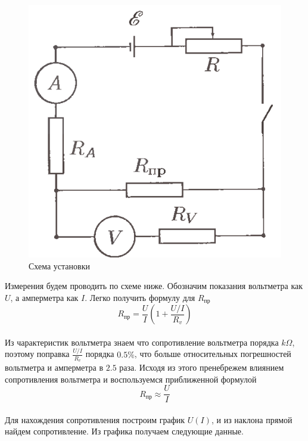 \documentclass[a4paper, 12pt]{article}
\begin{document}
    \begin{figure}
        \begin{center}
            \includegraphics[scale=0.3]{sxema.png}
            \caption{Схема установки}
        \end{center}
    \end{figure}
    Измерения будем проводить по схеме ниже. Обозначим показания вольтметра как $U$, а амперметра как $I$. Легко получить формулу для $R_{пр}$
    \[R_{пр} = \frac{U}{I}\left(1 + \frac{U/I}{R_{v}}\right)\]
    \paragraph{}
    Из чарактеристик вольтметра знаем что сопротивление вольтметра порядка $k\Omega$, поэтому поправка $\frac{U/I}{R_v}$ порядка $0.5\%$, что больше относительных погрешностей вольтметра и амперметра в $2.5$ раза. Исходя из этого пренебрежем влиянием сопротивления вольтметра и воспользуемся приближенной формулой
    \[R_{пр}\approx\frac{U}{I}\]
    \newpage
    \paragraph{}
    Для нахождения сопротивления построим график $U(I)$, и из наклона прямой найдем сопротивление. Из графика получаем следующие данные.
\end{document}

